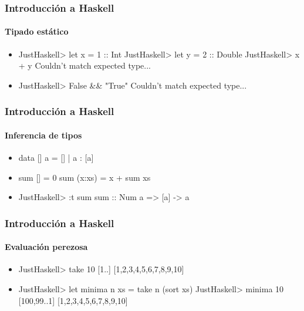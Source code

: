 \documentclass{beamer}
\begin{document}

\begin{frame}[fragile]
  \frametitle{Introducción a Haskell}
  \framesubtitle{Tipado estático}

  \begin{itemize}
  \item
    \begin{code}
JustHaskell> let x = 1 :: Int
JustHaskell> let y = 2 :: Double
JustHaskell> x + y
    Couldn't match expected type...
    \end{code}
  \item
    \begin{code}
JustHaskell> False && "True"
    Couldn't match expected type...
    \end{code}
  \end{itemize}
\end{frame}


\begin{frame}[fragile]
  \frametitle{Introducción a Haskell}
  \framesubtitle{Inferencia de tipos}

  \begin{itemize}
  \item
    \begin{code}
data [] a = [] | a : [a]
    \end{code}
  \item
    \begin{code}
sum []     = 0
sum (x:xs) = x + sum xs
    \end{code}
  \item
    \begin{code}
JustHaskell> :t sum
sum :: Num a => [a] -> a
    \end{code}
  \end{itemize}
\end{frame}


\begin{frame}[fragile]
  \frametitle{Introducción a Haskell}
  \framesubtitle{Evaluación perezosa}

  \begin{itemize}
  \item
    \begin{code}
JustHaskell> take 10 [1..]
[1,2,3,4,5,6,7,8,9,10]
    \end{code}
  \item
    \begin{code}
JustHaskell> let minima n xs = take n (sort xs)
JustHaskell> minima 10 [100,99..1]
[1,2,3,4,5,6,7,8,9,10]
    \end{code}
  \end{itemize}
\end{frame}
\end{document}
